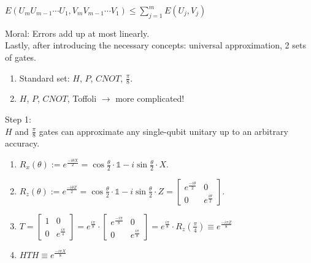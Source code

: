 \begin{proposition}
{
$E(U_m  U_{m-1} \cdots U_1, V_m  V_{m-1} \cdots V_1) \leq \sum^{m}_{j=1} E(U_j, V_j)$
}
\end{proposition}
Moral: Errors add up at most linearly. \\

Lastly, after introducing the necessary concepts: universal approximation, 2 sets of gates.
\begin{enumerate}
    \item Standard set: $H$, $P$, $CNOT$, $\frac{\pi}{8}$.
    \item $H$, $P$, $CNOT$, Toffoli $\rightarrow$ more complicated!  
\end{enumerate}
Step 1: \\

$H$ and $\frac{\pi}{8}$ gates can approximate any single-qubit unitary up to an arbitrary accuracy. \\
\begin{property}
\begin{enumerate}
    \item $R_x(\theta) := e^{\frac{-i \theta X}{2}} = \cos{\frac{\theta}{2}} \cdot \mathds{1} - i  \sin{\frac{\theta}{2}} \cdot X$.\\
    \item $R_z(\theta) := e^{\frac{-i \theta Z}{2}} = \cos{\frac{\theta}{2}} \cdot \mathds{1} - i  \sin{\frac{\theta}{2}} \cdot Z=
        \begin{bmatrix}
            e^{\frac{-i \theta}{2}} & 0  \\
            0 & e^{\frac{i \theta}{2}} 
        \end{bmatrix}.$\\

    \item $T =
        \begin{bmatrix}
            1 & 0  \\
            0 & e^{\frac{i \pi}{4}}
        \end{bmatrix}
        = e^{\frac{i \pi}{8}} \cdot
            \begin{bmatrix}
                e^{\frac{-i \pi}{8}} & 0  \\
                0 & e^{\frac{i \pi}{8}}
            \end{bmatrix}
        = e^{\frac{i \pi}{8}} \cdot R_z(\frac{\pi}{4}) \equiv e^{\frac{-i \pi Z}{8}}$ \\
        \item $HTH \equiv e^{\frac{-i \pi X}{8}}$ \\
\end{enumerate}
\end{property}
